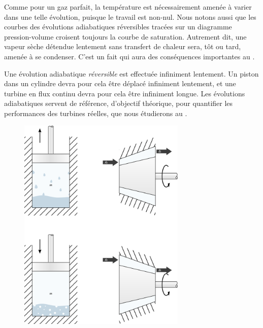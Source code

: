 		Comme pour un gaz parfait, la température est nécessairement amenée à varier dans une telle évolution, puisque le travail est non-nul. Nous notons aussi que les courbes des évolutions adiabatiques réversibles tracées sur un diagramme pression-volume croisent toujours la courbe de saturation. Autrement dit, une vapeur sèche détendue lentement sans transfert de chaleur sera, tôt ou tard, amenée à se condenser. C’est un fait qui aura des conséquences importantes au \coursneuf.

		Une évolution adiabatique \emph{réversible} est effectuée infiniment lentement. Un piston dans un cylindre devra pour cela être déplacé infiniment lentement, et une turbine en flux continu devra pour cela être infiniment longue. Les évolutions adiabatiques servent de référence, d’objectif théorique, pour quantifier les performances des turbines réelles, que nous étudierons au \coursneufshort.

		\begin{figure}
			\begin{center}
				\includegraphics[width=8cm]{images/lv_isentropique.png}
			\end{center}
			\label{fig_lv_isentropique}
		\end{figure}
		
